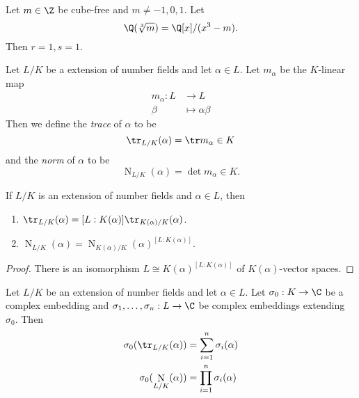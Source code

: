 \documentclass[a4paper]{article}
\DeclareMathOperator{\n}{N}
\begin{document}
\begin{eg}
  Let \(m \in \Z\) be cube-free and \(m \neq -1, 0, 1\). Let
  \[
    \Q(\sqrt[3]{m}) = \Q[x]/(x^3 - m).
  \]
  Then \(r = 1, s = 1\).
\end{eg}

\begin{definition}
  Let \(L/K\) be a extension of number fields and let \(\alpha \in L\). Let \(m_\alpha\) be the \(K\)-linear map
  \begin{align*}
    m_\alpha: L &\to L \\
    \beta &\mapsto \alpha\beta
  \end{align*}
  Then we define the \emph{trace} of \(\alpha\) to be
  \[
    \tr_{L/K}(\alpha) = \tr m_\alpha \in K
  \]
  and the \emph{norm} of \(\alpha\) to be
  \[
    \n_{L/K}(\alpha) = \det m_\alpha \in K.
  \]
\end{definition}

\begin{lemma}
  If \(L/K\) is an extension of number fields and \(\alpha \in L\), then
  \begin{enumerate}
  \item \(\tr_{L/K}(\alpha) = [L:K(\alpha)] \tr_{K(\alpha)/K}(\alpha)\).
  \item \(\n_{L/K}(\alpha) = \n_{K(\alpha)/K}(\alpha)^{[L:K(\alpha)]}\).
  \end{enumerate}
\end{lemma}

\begin{proof}
  There is an isomorphism \(L \cong K(\alpha)^{[L:K(\alpha)]}\) of \(K(\alpha)\)-vector spaces.
\end{proof}

\begin{lemma}
  Let \(L/K\) be an extension of number fields and let \(\alpha \in L\). Let \(\sigma_0: K \to \C\) be a complex embedding and \(\sigma_1, \dots, \sigma_n: L \to \C\) be complex embeddings extending \(\sigma_0\). Then
  \begin{align*}
    \sigma_0(\tr_{L/K}(\alpha)) &= \sum_{i = 1}^n \sigma_i(\alpha) \\
    \sigma_0(\n_{L/K}(\alpha)) &= \prod_{i = 1}^n \sigma_i(\alpha)
  \end{align*}
\end{lemma}
\end{document}

